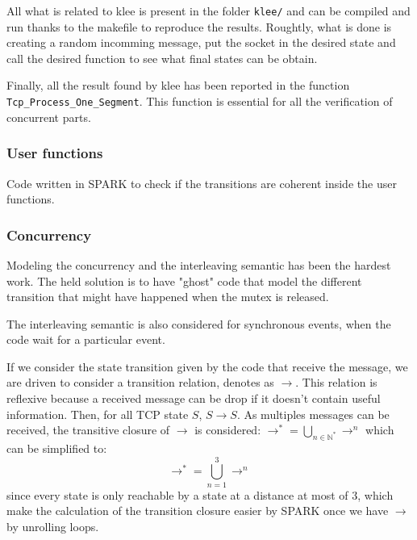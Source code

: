 \documentclass[a4paper, 10pt]{article}
\begin{document}
    All what is related to klee is present in the folder \texttt{klee/} and can be compiled and run
    thanks to the makefile to reproduce the results. Roughtly, what is done is creating a random
    incomming message, put the socket in the desired state and call the desired function to see what
    final states can be obtain.

    Finally, all the result found by klee has been reported in the function \lstinline[language=Ada]{Tcp_Process_One_Segment}.
    This function is essential for all the verification of concurrent parts.


    
    
    \subsubsection{User functions}

    Code written in SPARK to check if the transitions are coherent inside the user functions.

    \subsubsection{Concurrency}

    Modeling the concurrency and the interleaving semantic has been the hardest work.
    The held solution is to have "ghost" code that model the different transition that
    might have happened when the mutex is released.

    The interleaving semantic is also considered for synchronous events, when the code
    wait for a particular event.

    If we consider the state transition given by the code that receive the message, we
    are driven to consider a transition relation, denotes as $\rightarrow$. This relation
    is reflexive because a received message can be drop if it doesn't contain useful
    information. Then, for all TCP state $S$, $S \rightarrow S$. As multiples messages
    can be received, the transitive closure of $\rightarrow$ is considered:
    $\rightarrow^* = \bigcup_{n\in\mathbb{N}^*} \rightarrow^n$ which can be simplified to:
    \[\rightarrow^* = \bigcup_{n=1}^3 \rightarrow^n\]
    since every state is only reachable by a state at a distance at most of 3, which make
    the calculation of the transition closure easier by SPARK once we have $\rightarrow$ by
    unrolling loops.

    
\end{document}
